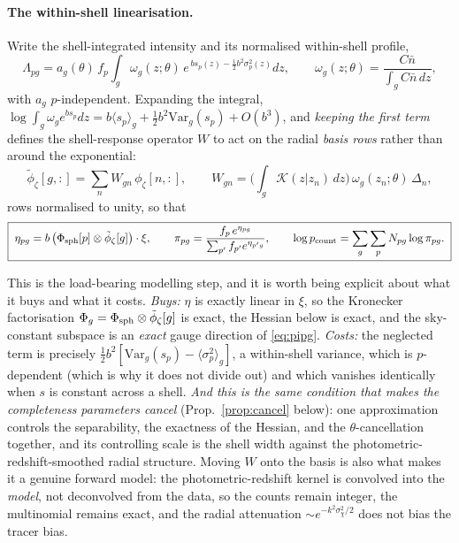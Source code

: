\documentclass[11pt]{article}
\theoremstyle{definition}
\theoremstyle{remark}
\newcommand{\nbar}{\bar n}
\newcommand{\Var}{\mathrm{Var}}
\begin{document}
\paragraph{The within-shell linearisation.} Write the shell-integrated intensity
and its normalised within-shell profile,
\begin{equation}
  \Lambda_{pg}=a_g(\theta)\,f_p\!\int_g\omega_g(z;\theta)\,
  e^{\,bs_p(z)-\frac12b^2\sigma_p^2(z)}dz,
  \qquad
  \omega_g(z;\theta)=\frac{C\nbar}{\int_gC\nbar\,dz},
  \label{eq:Lambdapg}
\end{equation}
with $a_g$ $p$-independent. Expanding the integral,
$\log\int_g\omega_ge^{bs_p}dz=b\langle s_p\rangle_g+\tfrac12b^2\Var_g(s_p)+O(b^3)$,
and \emph{keeping the first term} defines the shell-response operator $W$ to act on
the radial \emph{basis rows} rather than around the exponential:
\begin{equation}
  \tilde\phi_\zeta[g,:]=\sum_nW_{gn}\,\phi_\zeta[n,:],
  \qquad
  W_{gn}=\Big(\int_g\mathcal K(z|z_n)\,dz\Big)\,\omega_g(z_n;\theta)\,\Delta_n,
  \label{eq:Wdef}
\end{equation}
rows normalised to unity, so that
\begin{equation}
  \boxed{\;
  \eta_{pg}=b\,\big(\Phi_{\rm sph}[p]\otimes\tilde\phi_\zeta[g]\big)\cdot\xi,
  \qquad
  \pi_{pg}=\frac{f_p\,e^{\eta_{pg}}}{\sum_{p'}f_{p'}e^{\eta_{p'g}}},
  \qquad
  \log p_{\rm count}=\sum_g\sum_pN_{pg}\log\pi_{pg}. \;}
  \label{eq:pipg}
\end{equation}

This is the load-bearing modelling step, and it is worth being explicit about what
it buys and what it costs. \emph{Buys:} $\eta$ is exactly linear in $\xi$, so the
Kronecker factorisation $\Phi_g=\Phi_{\rm sph}\otimes\tilde\phi_\zeta[g]$ is exact,
the Hessian below is exact, and the sky-constant subspace is an \emph{exact} gauge
direction of \eqref{eq:pipg}. \emph{Costs:} the neglected term is precisely
$\tfrac12b^2[\Var_g(s_p)-\langle\sigma_p^2\rangle_g]$, a within-shell variance,
which is $p$-dependent (which is why it does not divide out) and which vanishes
identically when $s$ is constant across a shell. \emph{And this is the same
condition that makes the completeness parameters cancel} (Prop.~\ref{prop:cancel}
below): one approximation controls the separability, the exactness of the Hessian,
and the $\theta$-cancellation together, and its controlling scale is the shell
width against the photometric-redshift-smoothed radial structure. Moving $W$ onto
the basis is also what makes it a genuine forward model: the photometric-redshift
kernel is convolved into the \emph{model}, not deconvolved from the data, so the
counts remain integer, the multinomial remains exact, and the radial attenuation
$\sim e^{-k^2\sigma_\chi^2/2}$ does not bias the tracer bias.
\end{document}
